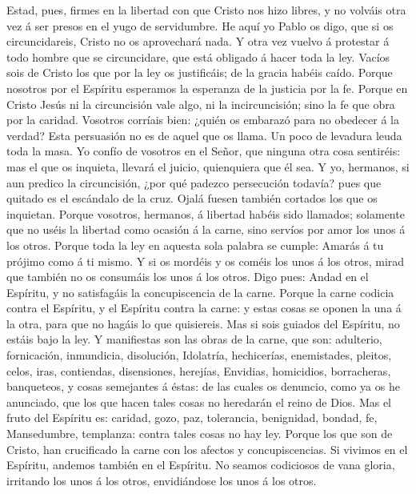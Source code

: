  Estad, pues, firmes en la libertad con que Cristo nos hizo
libres, y no volváis otra vez á ser presos en el yugo de servidumbre.
 He aquí yo Pablo os digo, que si os circuncidareis, Cristo
no os aprovechará nada.  Y otra vez vuelvo á protestar á
todo hombre que se circuncidare, que está obligado á hacer toda la ley.
 Vacíos sois de Cristo los que por la ley os justificáis; de
la gracia habéis caído.  Porque nosotros por el Espíritu
esperamos la esperanza de la justicia por la fe.  Porque en
Cristo Jesús ni la circuncisión vale algo, ni la incircuncisión; sino la
fe que obra por la caridad.  Vosotros corríais bien: ¿quién
os embarazó para no obedecer á la verdad?  Esta persuasión
no es de aquel que os llama.  Un poco de levadura leuda toda
la masa.  Yo confío de vosotros en el Señor, que ninguna
otra cosa sentiréis: mas el que os inquieta, llevará el juicio,
quienquiera que él sea.  Y yo, hermanos, si aun predico la
circuncisión, ¿por qué padezco persecución todavía? pues que quitado es
el escándalo de la cruz.  Ojalá fuesen también cortados los
que os inquietan.  Porque vosotros, hermanos, á libertad
habéis sido llamados; solamente que no uséis la libertad como ocasión á
la carne, sino servíos por amor los unos á los otros. 
Porque toda la ley en aquesta sola palabra se cumple: Amarás á tu
prójimo como á ti mismo.  Y si os mordéis y os coméis los
unos á los otros, mirad que también no os consumáis los unos á los
otros.  Digo pues: Andad en el Espíritu, y no satisfagáis
la concupiscencia de la carne.  Porque la carne codicia
contra el Espíritu, y el Espíritu contra la carne: y estas cosas se
oponen la una á la otra, para que no hagáis lo que quisiereis.
 Mas si sois guiados del Espíritu, no estáis bajo la ley.
 Y manifiestas son las obras de la carne, que son:
adulterio, fornicación, inmundicia, disolución,  Idolatría,
hechicerías, enemistades, pleitos, celos, iras, contiendas, disensiones,
herejías,  Envidias, homicidios, borracheras, banqueteos, y
cosas semejantes á éstas: de las cuales os denuncio, como ya os he
anunciado, que los que hacen tales cosas no heredarán el reino de Dios.
 Mas el fruto del Espíritu es: caridad, gozo, paz,
tolerancia, benignidad, bondad, fe,  Mansedumbre,
templanza: contra tales cosas no hay ley.  Porque los que
son de Cristo, han crucificado la carne con los afectos y
concupiscencias.  Si vivimos en el Espíritu, andemos
también en el Espíritu.  No seamos codiciosos de vana
gloria, irritando los unos á los otros, envidiándose los unos á los
otros.

